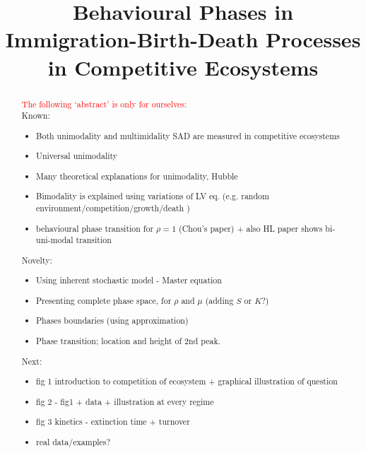 \documentclass[%
 amsmath,amssymb,
reprint,%
linenumbers]{revtex4-2}
\begin{document}

\title{Behavioural Phases in  Immigration-Birth-Death Processes in Competitive Ecosystems}





\begin{abstract}
\textcolor{red}{The following `abstract' is only for ourselves:} \\
Known:
\begin{itemize}
    \item Both unimodality and multimidality SAD are measured in competitive ecosystems
    \item Universal unimodality 
    \item Many theoretical explanations for unimodality, Hubble 
    \item Bimodality is explained using variations of LV eq.  (e.g. random environment/competition/growth/death ) 
    \item behavioural phase transition for $\rho=1$ (Chou's paper) + also HL paper shows bi-uni-modal transition 
\end{itemize}
Novelty:
\begin{itemize}
    \item Using inherent stochastic model - Master equation 
    \item Presenting complete phase space, for $\rho$ and $\mu$ (adding $S$ or $K$?)  
    \item Phases boundaries (using approximation)  
    \item Phase transition; location and height of 2nd peak.  
\end{itemize}
Next:
\begin{itemize}
    \item fig 1 introduction to competition of ecosystem
    + graphical illustration of question
    \item fig 2 - fig1 + data + illustration at every regime
    \item fig 3 kinetics - extinction time + turnover
    \item real data/examples?
\end{itemize}
\end{abstract}
\end{document}
